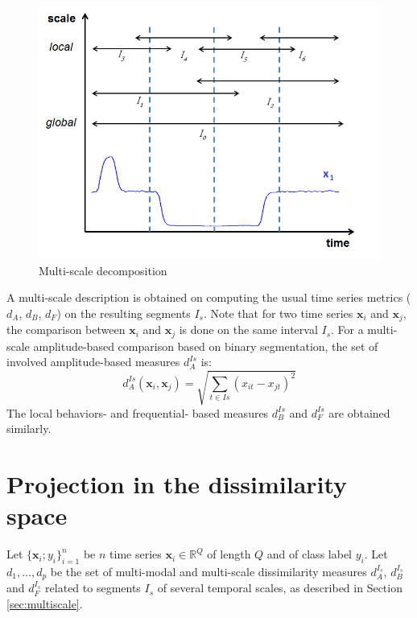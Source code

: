 \begin{figure}[h!]
	\centering
	\includegraphics[width=0.7\linewidth]{images/Intervalles3}
	\caption{Multi-scale decomposition}
	\label{fig:Intervalles}
\end{figure}

\noindent A multi-scale description is obtained on computing the usual time series metrics ($d_A$, $d_B$, $d_F$) on the resulting segments $I_s$. Note that for two time series $\textbf{x}_i$ and $\textbf{x}_j$, the comparison between $\textbf{x}_i$ and $\textbf{x}_j$ is done on the same interval $I_s$. For a multi-scale amplitude-based comparison based on binary segmentation, the set of involved amplitude-based measures $d^{Is}_A$ is:
\begin{equation}	
d^{Is}_A(\textbf{x}_i,\textbf{x}_j) = \sqrt{\sum\limits_{t \in Is} (x_{it}-x_{jt})^2}
\label{eq:A2}
\end{equation}
The local behaviors- and frequential- based measures $d^{Is}_B$ and $d^{Is}_F$ are obtained similarly.



\section{Projection in the dissimilarity space}
Let $\{\textbf{x}_i; y_i\}_{i=1}^n$ be $n$ time series $\textbf{x}_i \in \mathbb{R}^Q$ of length $Q$ and of class label $y_i$. Let $d_1, \ldots, d_p$ be the set of multi-modal and multi-scale dissimilarity measures $d_A^{I_s}$, $d_B^{I_s}$ and $d_F^{I_s}$ related to segments $I_s$ of
several temporal scales, as described in Section \ref{sec:multiscale}.

